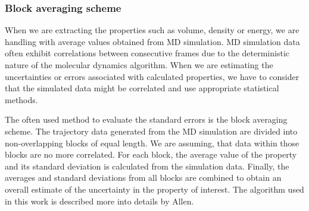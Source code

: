 \subsubsection{Block averaging scheme}
When we are extracting the properties such as volume, density or energy, we are handling with average values obtained from MD simulation. MD simulation data often exhibit correlations between consecutive frames due to the deterministic nature of the molecular dynamics algorithm. When we are estimating the uncertainties or errors associated with calculated properties, we have to consider that the simulated data might be correlated and use appropriate statistical methods. 

The often used method to evaluate the standard errors is the block averaging scheme. The trajectory data generated from the MD simulation are divided into non-overlapping blocks of equal length. We are assuming, that data within those blocks are no more correlated. For each block, the average value of the property and its standard deviation is calculated from the simulation data. Finally, the averages and standard deviations from all blocks are combined to obtain an overall estimate of the uncertainty in the property of interest. The algorithm used in this work is described more into details by Allen.  \cite{allen_computer_2017}


